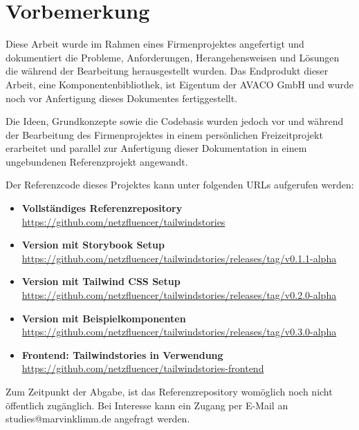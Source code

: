 \chapter*{Vorbemerkung}
\label{sec:vorbemerkung}

Diese Arbeit wurde im Rahmen eines Firmenprojektes angefertigt und dokumentiert die Probleme, Anforderungen, Herangehensweisen und Lösungen die während der Bearbeitung herausgestellt wurden. Das Endprodukt dieser Arbeit, eine Komponentenbibliothek, ist Eigentum der AVACO GmbH und wurde noch vor Anfertigung dieses Dokumentes fertiggestellt.

Die Ideen, Grundkonzepte sowie die Codebasis wurden jedoch vor und während der Bearbeitung des Firmenprojektes in einem persönlichen Freizeitprojekt erarbeitet und parallel zur Anfertigung dieser Dokumentation in einem ungebundenen Referenzprojekt angewandt.

Der Referenzcode dieses Projektes kann unter folgenden URLs aufgerufen werden:
\begin{itemize}
  \item \textbf{Vollständiges Referenzrepository}\newline
  \url{https://github.com/netzfluencer/tailwindstories}

  \item \textbf{Version mit Storybook Setup}\newline
  \url{https://github.com/netzfluencer/tailwindstories/releases/tag/v0.1.1-alpha}

  \item \textbf{Version mit Tailwind CSS Setup}\newline
  \url{https://github.com/netzfluencer/tailwindstories/releases/tag/v0.2.0-alpha}

  \item \textbf{Version mit Beispielkomponenten}\newline
  \url{https://github.com/netzfluencer/tailwindstories/releases/tag/v0.3.0-alpha}

  \item \textbf{Frontend: Tailwindstories in Verwendung}\newline
  \url{https://github.com/netzfluencer/tailwindstories-frontend}
  
\end{itemize}

Zum Zeitpunkt der Abgabe, ist das Referenzrepository womöglich noch nicht öffentlich zugänglich. Bei Interesse kann ein Zugang per E-Mail an studies@marvinklimm.de angefragt werden.
